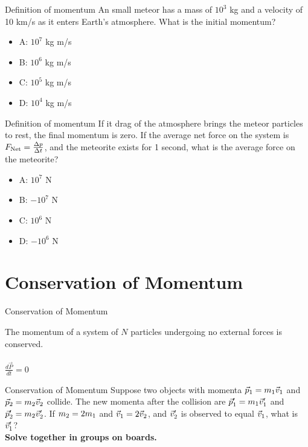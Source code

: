 \documentclass{beamer}
\begin{document}
\begin{frame}{Definition of momentum}
An small meteor has a mass of $10^{3}$ kg and a velocity of 10 km/s as it enters Earth's atmosphere.  What is the initial momentum?
\begin{itemize}
\item A: $10^{7}$ kg m/s
\item B: $10^{6}$ kg m/s
\item C: $10^{5}$ kg m/s
\item D: $10^{4}$ kg m/s
\end{itemize}
\end{frame}

\begin{frame}{Definition of momentum}
If it drag of the atmosphere brings the meteor particles to rest, the final momentum is zero.  If the average net force on the system is $F_{\rm Net} = \frac{\Delta p}{\Delta t}$, and the meteorite exists for 1 second, what is the average force on the meteorite?
\begin{itemize}
\item A: $10^{7}$ N
\item B: $-10^{7}$ N
\item C: $10^{6}$ N
\item D: $-10^{6}$ N
\end{itemize}
\end{frame}

\section{Conservation of Momentum}

\begin{frame}{Conservation of Momentum}
\begin{tcolorbox}[colback=white,colframe=red!40!blue,title=Conservation of Momentum]
\alert{The momentum of a system of $N$ particles undergoing no external forces is conserved.} \\ \\
\alert{$\frac{d\vec{P}}{dt}=0$}
\end{tcolorbox}
\end{frame}

\begin{frame}{Conservation of Momentum}
Suppose two objects with momenta $\vec{p}_{\rm 1} = m_{\rm 1}\vec{v}_{\rm 1}$ and $\vec{p}_{\rm 2} = m_{\rm 2}\vec{v}_{\rm 2}$ collide. The new momenta after the collision are $\vec{p}'_{\rm 1} = m_{\rm 1}\vec{v}'_{\rm 1}$ and $\vec{p}'_{\rm 2} = m_{\rm 2}\vec{v}'_{\rm 2}$.  If $m_{\rm 2} = 2 m_{\rm 1}$ and $\vec{v}_{\rm 1} = 2\vec{v}_{\rm 2}$, and $\vec{v}'_{\rm 2}$ is observed to equal $\vec{v}_{\rm 1}$, what is $\vec{v}'_{\rm 1}$? \\ \vspace{1cm}
\textbf{Solve together in groups on boards.}
\end{frame}
\end{document}
